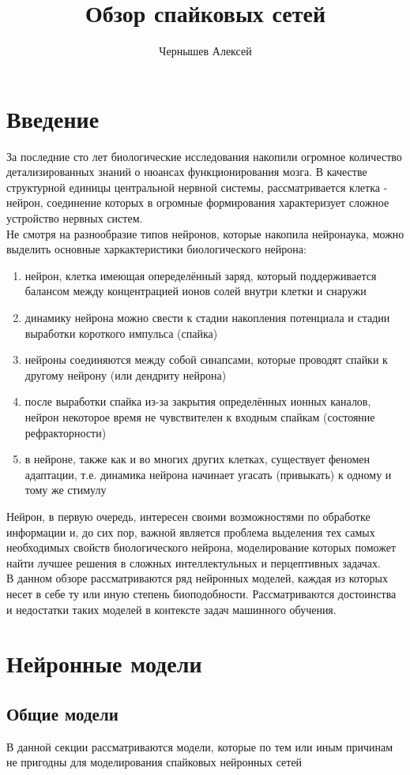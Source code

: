 \documentclass[a4paper,10pt]{article}
\title{Обзор спайковых сетей}
\author{Чернышев Алексей}
\begin{document}


\tableofcontents
\clearpage
\section{Введение}
	\indent За последние сто лет биологические исследования накопили огромное количество детализированных знаний о нюансах функционирования мозга. В качестве структурной единицы центральной нервной системы, рассматривается клетка - нейрон, соединение которых в огромные формирования характеризует сложное  устройство нервных систем.\\
	\indent Не смотря на разнообразие типов нейронов, которые накопила нейронаука, можно выделить основные харкактеристики биологического нейрона:
	\begin{enumerate}
	\item нейрон, клетка имеющая опеределённый заряд, который поддерживается балансом между концентрацией ионов солей внутри клетки и снаружи
	\item динамику нейрона можно свести к стадии накопления потенциала и стадии выработки короткого импульса	 (спайка)
	\item нейроны соединяются между собой синапсами, которые проводят спайки к другому нейрону (или дендриту нейрона)
	\item после выработки спайка из-за закрытия определённых ионных каналов, нейрон некоторое время не чувствителен к входным спайкам (состояние рефракторности)
	\item в нейроне, также как и во многих других клетках, существует феномен адаптации, т.е. динамика нейрона начинает угасать (привыкать) к одному и тому же стимулу
	\end{enumerate}
	Нейрон, в первую очередь, интересен своими возможностями по обработке информации и, до сих пор, важной является проблема выделения тех самых необходимых свойств биологического нейрона, моделирование которых поможет найти лучшее решения в сложных интеллектульных и перцептивных задачах.\\
	\indent В данном обзоре рассматриваются ряд нейронных моделей, каждая из которых несет в себе ту или иную степень биоподобности. Рассматриваются достоинства и недостатки таких моделей в контексте задач машинного обучения.

\section{Нейронные модели}
\subsection{Общие модели}
В данной секции рассматриваются модели, которые по тем или иным причинам не пригодны для моделирования спайковых нейронных сетей
\end{document}
